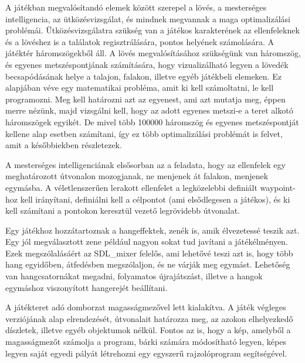 
A játékban megvalósítandó elemek között szerepel a lövés, a mesterséges intelligencia, az ütközésvizsgálat, és mindnek megvannak a maga optimalizálási problémái. Ütközésvizsgálatra szükség van a játékos karakterének az ellenfeleknek és a lövéshez is a találatok regisztrálására, pontos helyének számolására. A játéktér háromszögekből áll. A lövés megvalósításához szükségünk van háromszög, és egyenes metszéspontjának számítására, hogy vizualizálható legyen a lövedék becsapódásának helye a talajon, falakon, illetve egyéb játékbeli elemeken. Ez alapjában véve egy matematikai probléma, amit ki kell számoltatni, le kell programozni. Meg kell határozni azt az egyenest, ami azt mutatja meg, éppen merre nézünk, majd vizsgálni kell, hogy az adott egyenes metszi-e a teret alkotó háromszögek egyikét. De mivel több 100000 háromszög és egyenes metszéspontját kellene alap esetben számítani, így ez több optimalizálási problémát is felvet, amit a későbbiekben részletezek.



A mesterséges intelligenciának elsősorban az a feladata, hogy az ellenfelek egy meghatározott útvonalon mozogjanak, ne menjenek át falakon, menjenek egymásba. A véletlenszerűen lerakott ellenfelet a legközelebbi definiált waypoint-hoz kell irányítani, definiálni kell a célpontot (ami elsődlegesen a játékos), és ki kell számítani a pontokon keresztül vezető legrövidebb útvonalat.


Egy játékhoz hozzátartoznak a hangeffektek, zenék is, amik élvezetessé teszik azt. Egy jól megválasztott zene például nagyon sokat tud javítani a játékélményen. Ezek megszólalásáért az SDL\_mixer felelős, ami lehetővé teszi azt is, hogy több hang egyidőben, átfedésben megszólaljon, és ne várják meg egymást. Lehetőség van hangcsatornákat megadni, folyamatos újrajátszást, illetve a hangok egymáshoz viszonyított hangerejét beállítani.


A játékteret adó domborzat magasságmezővel lett kialakítva. A játék végleges verziójának alap elrendezését, útvonalait határozza meg, az azokon elhelyezkedő díszletek, illetve egyéb objektumok nélkül. Fontos az is, hogy a kép, amelyből a magasságmezőt számolja a program, bárki számára módosítható legyen, képes legyen saját egyedi pályát létrehozni egy egyszerű rajzolóprogram segítségével.

